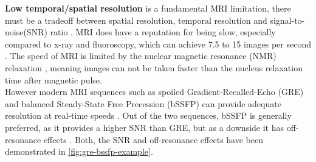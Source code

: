\documentclass{article}
\begin{document}
\textbf{Low temporal/spatial resolution} is a fundamental MRI limitation, there must be a tradeoff between spatial resolution, temporal resolution and signal-to-noise(SNR) ratio \cite{real-time-mri}. MRI does have a reputation for being slow, especially compared to x-ray and fluoroscopy, which can achieve 7.5 to 15 images per second \cite{pmid25208902}. The speed of MRI is limited by the nuclear magnetic resonance (NMR) relaxation \cite{real-time-mri}, meaning images can not be taken faster than the nucleus relaxation time after magnetic pulse.
\\
However modern MRI sequences such as spoiled Gradient-Recalled-Echo (GRE) and balanced Steady-State Free Precession (bSSFP) can provide adequate resolution at real-time speeds \cite{real-time-mri}. Out of the two sequences, bSSFP is generally preferred, as it provides a higher SNR than GRE, but as a downside it has off-resonance effects \cite{bssfp-vs-gre-mri}. Both, the SNR and off-resonance effects have been demonstrated in \autoref{fig:gre-bssfp-example}.
\end{document}
